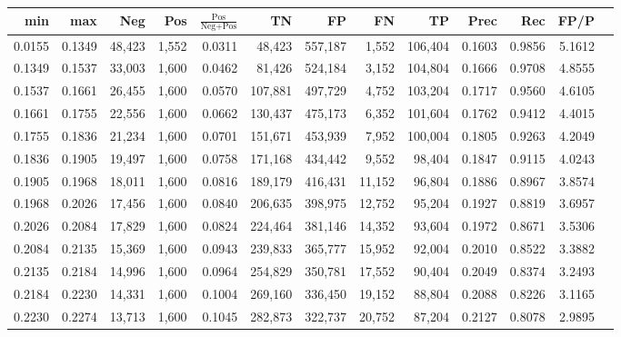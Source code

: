 \begin{tabular}{rrrrrrrrrrrrr}
\toprule
   min &    max &    Neg &   Pos & $\frac{\text{Pos}}{\text{Neg}+\text{Pos}}$ &      TN &      FP &      FN &      TP &   Prec &    Rec &   FP/P \\
\midrule
0.0155 & 0.1349 & 48,423 & 1,552 &                                     0.0311 &  48,423 & 557,187 &   1,552 & 106,404 & 0.1603 & 0.9856 & 5.1612 \\
0.1349 & 0.1537 & 33,003 & 1,600 &                                     0.0462 &  81,426 & 524,184 &   3,152 & 104,804 & 0.1666 & 0.9708 & 4.8555 \\
0.1537 & 0.1661 & 26,455 & 1,600 &                                     0.0570 & 107,881 & 497,729 &   4,752 & 103,204 & 0.1717 & 0.9560 & 4.6105 \\
0.1661 & 0.1755 & 22,556 & 1,600 &                                     0.0662 & 130,437 & 475,173 &   6,352 & 101,604 & 0.1762 & 0.9412 & 4.4015 \\
0.1755 & 0.1836 & 21,234 & 1,600 &                                     0.0701 & 151,671 & 453,939 &   7,952 & 100,004 & 0.1805 & 0.9263 & 4.2049 \\
0.1836 & 0.1905 & 19,497 & 1,600 &                                     0.0758 & 171,168 & 434,442 &   9,552 &  98,404 & 0.1847 & 0.9115 & 4.0243 \\
0.1905 & 0.1968 & 18,011 & 1,600 &                                     0.0816 & 189,179 & 416,431 &  11,152 &  96,804 & 0.1886 & 0.8967 & 3.8574 \\
0.1968 & 0.2026 & 17,456 & 1,600 &                                     0.0840 & 206,635 & 398,975 &  12,752 &  95,204 & 0.1927 & 0.8819 & 3.6957 \\
0.2026 & 0.2084 & 17,829 & 1,600 &                                     0.0824 & 224,464 & 381,146 &  14,352 &  93,604 & 0.1972 & 0.8671 & 3.5306 \\
0.2084 & 0.2135 & 15,369 & 1,600 &                                     0.0943 & 239,833 & 365,777 &  15,952 &  92,004 & 0.2010 & 0.8522 & 3.3882 \\
0.2135 & 0.2184 & 14,996 & 1,600 &                                     0.0964 & 254,829 & 350,781 &  17,552 &  90,404 & 0.2049 & 0.8374 & 3.2493 \\
0.2184 & 0.2230 & 14,331 & 1,600 &                                     0.1004 & 269,160 & 336,450 &  19,152 &  88,804 & 0.2088 & 0.8226 & 3.1165 \\
0.2230 & 0.2274 & 13,713 & 1,600 &                                     0.1045 & 282,873 & 322,737 &  20,752 &  87,204 & 0.2127 & 0.8078 & 2.9895 \\

\end{tabular}
